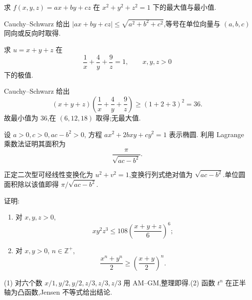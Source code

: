 \begin{example}
    求 $f(x,y,z)=ax+by+cz$ 在 $x^2+y^2+z^2=1$ 下的最大值与最小值.
\end{example}
\exampleblank

\begin{solution}
    Cauchy--Schwarz 给出 $|ax+by+cz|\leq\sqrt{a^2+b^2+c^2}$,等号在单位向量与 $(a,b,c)$ 同向或反向时取得.
\end{solution}

\begin{example}
    求 $u=x+y+z$ 在
    \[
        \dfrac{1}{x}+\dfrac{4}{y}+\dfrac{9}{z}=1,
        \qquad x,y,z>0
    \]
    下的极值.
\end{example}
\exampleblank

\begin{solution}
    Cauchy--Schwarz 给出
    \[
        (x+y+z)\left(\dfrac{1}{x}+\dfrac{4}{y}+\dfrac{9}{z}\right)\geq(1+2+3)^2=36.
    \]
    故最小值为 $36$,在 $(6,12,18)$ 取得;无最大值.
\end{solution}

\begin{example}[\markstar]
    设 $a>0,c>0,ac-b^2>0$, 方程 $ax^2+2bxy+cy^2=1$ 表示椭圆. 利用 Lagrange 乘数法证明其面积为
    \[
        \dfrac{\pi}{\sqrt{ac-b^2}}.
    \]
\end{example}
\exampleblank

\begin{solution}
    正定二次型可经线性变换化为 $u^2+v^2=1$,变换行列式绝对值为 $\sqrt{ac-b^2}$.单位圆面积除以该值即得 $\pi/\sqrt{ac-b^2}$.
\end{solution}

\begin{example}
    证明:
    \begin{enumerate}
        \item 对 $x,y,z>0$,
              \[
                  xy^2z^3\leq108\left(\dfrac{x+y+z}{6}\right)^6;
              \]
        \item 对 $x,y>0$, $n\in\mathbb{Z}^+$,
              \[
                  \dfrac{x^n+y^n}{2}\geq\left(\dfrac{x+y}{2}\right)^n.
              \]
    \end{enumerate}
\end{example}
\exampleblank

\begin{solution}
    (1) 对六个数 $x/1,y/2,y/2,z/3,z/3,z/3$ 用 AM--GM,整理即得.(2) 函数 $t^n$ 在正半轴为凸函数,Jensen 不等式给出结论.
\end{solution}

